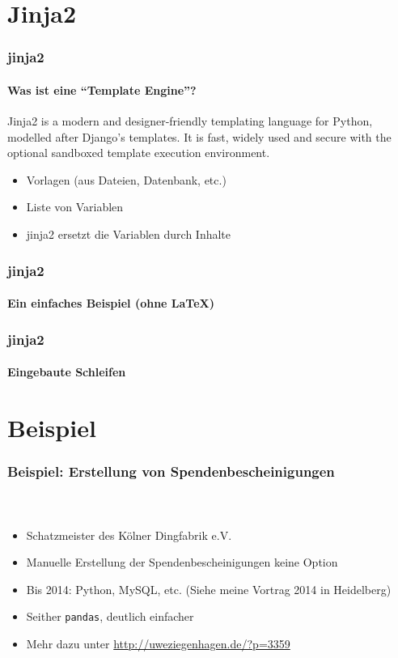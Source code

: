 \documentclass[12pt,ngerman]{beamer}
\begin{document}
\section{Jinja2}


\begin{frame}
\frametitle{jinja2}
\framesubtitle{Was ist eine \enquote{Template Engine}?}

\begin{infobox}
Jinja2 is a modern and designer-friendly templating language for Python, modelled after Django’s templates. It is fast, widely used and secure with the optional sandboxed template execution environment.
\end{infobox}

\begin{itemize}
	\item Vorlagen (aus Dateien, Datenbank, etc.)
	\item Liste von Variablen
	\item jinja2 ersetzt die Variablen durch Inhalte
\end{itemize}

\end{frame}

\begin{frame}[fragile]
\frametitle{jinja2}
\framesubtitle{Ein einfaches Beispiel (ohne \LaTeX)}

 

 

\end{frame}

\begin{frame}[fragile]
\frametitle{jinja2}
\framesubtitle{Eingebaute Schleifen}

 

\end{frame}




\section{Beispiel}

\begin{frame}
\frametitle{Beispiel: Erstellung von Spendenbescheinigungen}
\framesubtitle{~}

\begin{itemize}
\item Schatzmeister des Kölner Dingfabrik e.V.
\item Manuelle Erstellung der Spendenbescheinigungen keine Option
\item Bis 2014: Python, MySQL, etc. (Siehe meine Vortrag 2014 in Heidelberg)
\item Seither \texttt{pandas}, deutlich einfacher
\item Mehr dazu unter \url{http://uweziegenhagen.de/?p=3359}
\end{itemize}
\end{frame}
\end{document}
